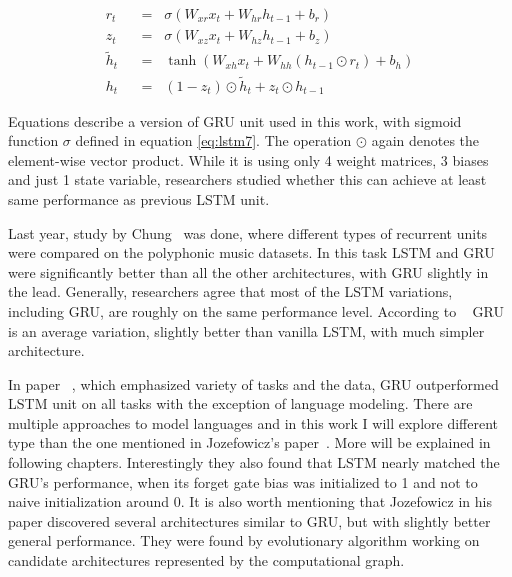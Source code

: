 \begin{align}
r_t \hspace{7pt}&=\hspace{7pt} \sigma(W_{xr}x_t + W_{hr}h_{t-1} + b_r) \label{eq:gru1}\\
z_t \hspace{7pt}&=\hspace{7pt} \sigma(W_{xz}x_t + W_{hz}h_{t-1} + b_z) \label{eq:gru2}\\
\widetilde{h}_t \hspace{7pt}&=\hspace{7pt} \tanh(W_{xh}x_t + W_{hh}(h_{t-1}\odot r_t) + b_h) \label{eq:gru3}\\
h_t \hspace{7pt}&=\hspace{7pt} (1-z_t)\odot \widetilde{h}_t + z_t\odot h_{t-1} \label{eq:gru4}
\end{align}

Equations describe a version of GRU unit used in this work, with sigmoid function $ \sigma $ defined in equation \eqref{eq:lstm7}. The operation $ \odot $ again denotes the element-wise vector product. While it is using only 4 weight matrices, 3 biases and just 1 state variable, researchers studied whether this can achieve at least same performance as previous LSTM unit.

Last year, study by Chung~\cite{DBLP:journals/corr/ChungGCB14} was done, where different types of recurrent units were compared on the polyphonic music datasets. In this task LSTM and GRU were significantly better than all the other architectures, with GRU slightly in the lead. Generally, researchers agree that most of the LSTM variations, including GRU, are roughly on the same performance level. According to ~\cite{DBLP:journals/corr/GreffSKSS15} GRU is an average variation, slightly better than vanilla LSTM, with much simpler architecture.

In paper ~\cite{DBLP:conf/icml/JozefowiczZS15}, which emphasized variety of tasks and the data, GRU outperformed LSTM unit on all tasks with the exception of language modeling. There are multiple approaches to model languages and in this work I will explore different type than the one mentioned in Jozefowicz's paper~\cite{DBLP:conf/icml/JozefowiczZS15}. More will be explained in following chapters. Interestingly they also found that LSTM nearly matched the GRU's performance, when its forget gate bias was initialized to 1 and not to naive initialization around 0.
It is also worth mentioning that Jozefowicz in his paper discovered several architectures similar to GRU, but with slightly better general performance. They were found by evolutionary algorithm working on candidate architectures  represented by the computational graph.


